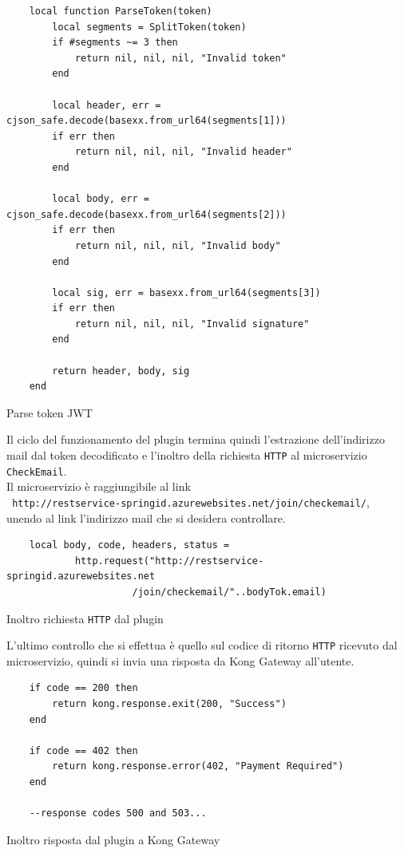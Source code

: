 \begin{algorithm}
\centering
\begin{verbatim}
	local function ParseToken(token)
		local segments = SplitToken(token)
		if #segments ~= 3 then
			return nil, nil, nil, "Invalid token"
		end

		local header, err = cjson_safe.decode(basexx.from_url64(segments[1]))
		if err then
			return nil, nil, nil, "Invalid header"
		end

		local body, err = cjson_safe.decode(basexx.from_url64(segments[2]))
		if err then
			return nil, nil, nil, "Invalid body"
		end

		local sig, err = basexx.from_url64(segments[3])
		if err then
			return nil, nil, nil, "Invalid signature"
		end

		return header, body, sig
	end
\end{verbatim}
\caption{Parse token JWT}\label{alg:parsetoken}
\end{algorithm}
\newpage
Il ciclo del funzionamento del plugin termina quindi l'estrazione dell'indirizzo mail dal token decodificato e l'inoltro della richiesta \texttt{HTTP} al microservizio \texttt{CheckEmail}.\\
Il microservizio è raggiungibile al link\\ \texttt{ http://restservice-springid.azurewebsites.net/join/checkemail/}, \\unendo al link l'indirizzo mail che si desidera controllare.\\
\begin{algorithm}
\centering
\begin{verbatim}
    local body, code, headers, status = 
			http.request("http://restservice-springid.azurewebsites.net
				      /join/checkemail/"..bodyTok.email)
\end{verbatim}
\caption{Inoltro richiesta \texttt{HTTP} dal plugin}\label{alg:pluginhttprequest }
\end{algorithm}

L'ultimo controllo che si effettua è quello sul codice di ritorno \texttt{HTTP} ricevuto dal microservizio, quindi si invia una risposta da Kong Gateway all'utente.

\begin{algorithm}
\centering
\begin{verbatim}
    if code == 200 then
        return kong.response.exit(200, "Success")
    end

    if code == 402 then
        return kong.response.error(402, "Payment Required")
    end

	--response codes 500 and 503...
\end{verbatim}
\caption{Inoltro risposta dal plugin a Kong Gateway}\label{alg:plugingatewayresponse}
\end{algorithm}

